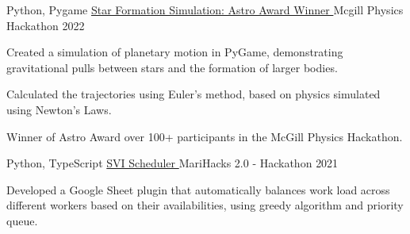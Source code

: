 \begin{cventries}
  \cventry
    {Python, Pygame} %
    {\href{https://devpost.com/software/star-formation}{Star Formation Simulation: Astro Award Winner {\faLink}}} %
    {Mcgill Physics Hackathon} %
    {2022} %
    {
      \begin{cvitems} %
        \item {Created a simulation of planetary motion in PyGame, demonstrating gravitational pulls between stars and the formation of larger bodies.}
        \item {Calculated the trajectories using Euler's method, based on physics simulated using Newton's Laws.}
        \item {Winner of Astro Award over 100+ participants in the McGill Physics Hackathon. }
      \end{cvitems}
    }

  \cventry
    {Python, TypeScript} %
    {\href{https://devpost.com/software/svi-scheduler}{SVI Scheduler {\faLink}}} %
    {MariHacks 2.0 - Hackathon} %
    {2021} %
    {
      \begin{cvitems} %
        \item {Developed a Google Sheet plugin that automatically balances work load across different workers based on their availabilities, using greedy algorithm and priority queue.}
      \end{cvitems}
    }

\end{cventries}
